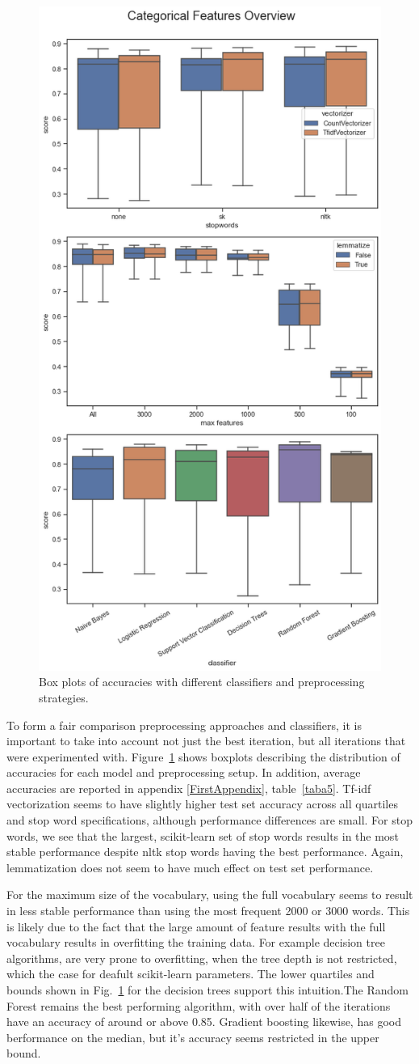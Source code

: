 \documentclass[conference]{IEEEtran}
\begin{document}
\begin{figure}[htbp]
\centerline{\includegraphics[width = 0.5 \textwidth]{fig2.png}}
\caption{Box plots of accuracies with different classifiers and preprocessing strategies.}
\label{fig2}
\end{figure}

To form a fair comparison preprocessing approaches and classifiers, it is important to take into account not just the best iteration, but all iterations that were experimented with. Figure~\ref{fig2}  shows boxplots describing the distribution of accuracies for each model and preprocessing setup. In addition, average accuracies are reported in appendix \ref{FirstAppendix}, table~\ref{taba5}. Tf-idf vectorization seems to have slightly higher test set accuracy across all quartiles and stop word specifications, although performance differences are small. For stop words, we see that the largest, scikit-learn set of stop words results in the most stable performance despite nltk stop words having the best performance. Again, lemmatization does not seem to have much effect on test set performance.

For the maximum size of the vocabulary, using the full vocabulary seems to result in less stable performance than using the most frequent 2000 or 3000 words. This is likely due to the fact that the large amount of feature results with the full vocabulary results in overfitting the training data. For example decision tree algorithms, are very prone to overfitting, when the tree depth is not restricted, which the case for deafult scikit-learn parameters. The lower quartiles and bounds shown in Fig.~\ref{fig2} for the decision trees support this intuition.The Random Forest remains the best performing algorithm, with over half of the iterations have an accuracy of around or above 0.85. Gradient boosting  likewise, has good berformance on the median, but it's accuracy seems restricted in the upper bound.
\end{document}
